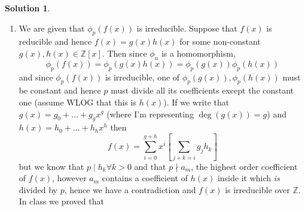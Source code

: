 \documentclass[10pt]{article}
\theoremstyle{definition}
\newtheorem{soln}{Solution}
\begin{document}
\begin{soln}
\begin{enumerate}[label=(\alph*)]
\begin{align*}
          \end{align*}
          Now under multiplication,
          \begin{align*}
            \phi_n\left(\sum_{i=0}^{k}a_ix^i\sum_{i=0}^{k}b_ix^i\right) & = \phi_n\left(\sum_{i=0}^{2k}\left[x^i\sum_{m+l=i}a_mb_l\right]\right)                                     \\
                                                                        & = \sum_{i=0}^{2k}\left[x^i\sum_{m+l=i}a_m\cdot_n b_l\mod n\right]                                          \\
                                                                        & = \sum_{i=0}^{2k}\left[x^i\sum_{m+l=i}\left(a_m\mod n \cdot  b_l\mod n\right)\mod n\right]                 \\
                                                                        & = \left(\left[\sum_{i=0}^{k}x^ia_i\mod n\right]\cdot\left[\sum_{i=0}^{k}x^ib_i\mod n\right]  \right)\mod n \\
                                                                        & =\phi_n\left(\sum_{i=0}^{k}a_ix^i\right)\phi_n\left(\sum_{i=0}^{k}b_ix^i\right)
          \end{align*}
          This can also be seen (and was most immediately obvious to me) by noting that we already know that the ``mod map'' from $\mathbb{Z}\to\mathbb{Z}_n$ is a ring homomorphism
          and hence the given map, which really only acts on the coefficients, will naturally be one as well.
    \item We are given that $\phi_p(f(x))$ is irreducible. Suppose that $f(x)$ is reducible and hence $f(x)=g(x)h(x)$ for some non-constant $g(x),h(x)\in\mathbb{Z}[x]$.
          Then since $\phi_n$ is a homomorphism, $$\phi_p(f(x))=\phi_p(g(x)h(x))=\phi_p(g(x))\phi_p(h(x))$$
          and since $\phi_p(f(x))$ is irreducible, one of $\phi_p(g(x)),\phi_p(h(x))$ must be constant and hence $p$ must divide all its coefficients except the constant one
          (assume WLOG that this is $h(x)$).
          If we write that
          $g(x)=g_0+\dots+g_gx^g$ (where I'm representing $\deg(g(x))=g$) and $h(x)=h_0+\dots+h_hx^h$ then
          $$f(x)=\sum_{i=0}^{g+h}x^i\left[\sum_{j+k=i}g_jh_k\right]$$ but we know that $p\mid h_k\forall k>0$ and that $p\nmid a_m$, the highest order coefficient of $f(x)$, however $a_m$ contains
          a coefficient of $h(x)$ inside it which \emph{is} divided by $p$, hence we have a contradiction and $f(x)$ is irreducible over $\mathbb{Z}$. In class we proved that

\end{enumerate}
\end{soln}
\end{document}
